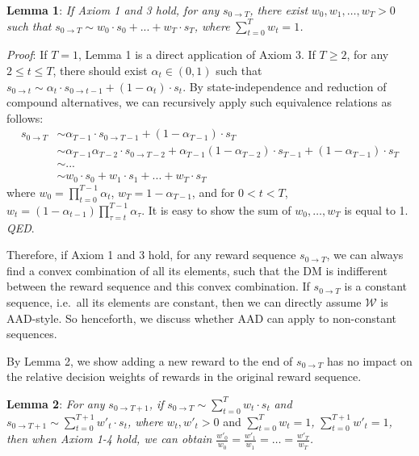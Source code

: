 \documentclass[
  12pt,
]{article}
\begin{document}
\noindent \textbf{Lemma 1}: \emph{If Axiom 1 and 3 hold, for any}
\(s_{0\rightarrow T}\)\emph{, there exist} \(w_0, w_1, …, w_T > 0\)
\emph{such that}
\(s_{0\rightarrow T} \sim w_0 \cdot s_0 + ...+w_T\cdot s_T\)\emph{,
where} \(\sum_{t=0}^T w_t=1\)\emph{.}

\noindent \emph{Proof}: If \(T=1\), Lemma 1 is a direct application of
Axiom 3. If \(T\geq 2\), for any \(2\leq t\leq T\), there should exist
\(\alpha_t\in(0,1)\) such that
\(s_{0\rightarrow t}\sim \alpha_t\cdot s_{0\rightarrow t-1}+(1-\alpha_t)\cdot s_{t}\).
By state-independence and reduction of compound alternatives, we can
recursively apply such equivalence relations as follows:\[
\begin{aligned}
s_{0\rightarrow T} &\sim \alpha_{T-1}\cdot s_{0\rightarrow T-1} + (1-\alpha_{T-1})\cdot s_T \\
&\sim  \alpha_{T-1}\alpha_{T-2}\cdot s_{0\rightarrow T-2} + \alpha_{T-1}(1-\alpha_{T-2})\cdot s_{T-1} + (1-\alpha_{T-1})\cdot s_T \\
& \sim ...\\
& \sim w_0 \cdot s_0 + w_1\cdot s_1 +... +w_T\cdot s_T
\end{aligned}
\]where \(w_0=\prod_{t=0}^{T-1}\alpha_t\), \(w_T = 1-\alpha_{T-1}\), and
for \(0<t<T\),
\(w_t=(1-\alpha_{t-1})\prod_{\tau=t}^{T-1}\alpha_{\tau}\). It is easy to
show the sum of \(w_0,…,w_T\) is equal to 1. \emph{QED}.

Therefore, if Axiom 1 and 3 hold, for any reward sequence
\(s_{0\rightarrow T}\), we can always find a convex combination of all
its elements, such that the DM is indifferent between the reward
sequence and this convex combination. If \(s_{0\rightarrow T}\) is a
constant sequence, i.e.~all its elements are constant, then we can
directly assume \(\mathcal{W}\) is AAD-style. So henceforth, we discuss
whether AAD can apply to non-constant sequences.

By Lemma 2, we show adding a new reward to the end of
\(s_{0\rightarrow T}\) has no impact on the relative decision weights of
rewards in the original reward sequence.

\noindent \textbf{Lemma 2}: \emph{For any}
\(s_{0\rightarrow T+1}\)\emph{, if}
\(s_{0\rightarrow T}\sim \sum_{t=0}^T w_t \cdot s_t\) \emph{and}
\(s_{0\rightarrow T+1} \sim \sum_{t=0}^{T+1} w'_t\cdot s_t\)\emph{,
where} \(w_t, w'_t>0\) and \(\sum_{t=0}^Tw_t=1\)\emph{,}
\(\sum_{t=0}^{T+1}w'_t=1\)\emph{, then when Axiom 1-4 hold, we can
obtain} \(\frac{w'_0}{w_0}=\frac{w'_1}{w_1}=…=\frac{w'_T}{w_T}\)\emph{.}
\end{document}
